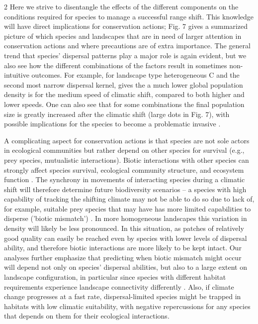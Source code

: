 \documentclass[12pt,pdftex]{article}
\begin{document}
\begin{spacing}{2}
Here we strive to disentangle the effects of the different components on the conditions required for species to manage a successful range shift. This knowledge will have direct implications for conservation actions; Fig. 7 gives a summarized picture of which species and landscapes that are in need of larger attention in conservation actions and where precautions are of extra importance. The general trend that species' dispersal patterns play a major role is again evident, but we also see how the different combinations of the factors result in sometimes non-intuitive outcomes. For example, for landscape type heterogeneous C and the second most narrow dispersal kernel, gives the a much lower global population density is for the medium speed of climatic shift, compared to both higher and lower speeds. One can also see that for some combinations the final population size is greatly increased after the climatic shift (large dots in Fig. 7), with possible implications for the species to become a problematic invasive \citep[for a summary of potential mechanisms, see ][]{Hellmann2008}.  %

A complicating aspect for conservation actions is that species are not sole actors in ecological communities but rather depend on other species for survival (e.g., prey species, mutualistic interactions). Biotic interactions with other species can strongly affect species survival, ecological community structure, and ecosystem function \citep{Pocock2012}. The synchrony in movements of interacting species during a climatic shift will therefore determine future biodiversity scenarios – a species with high capability of tracking the shifting climate may not be able to do so due to lack of, for example, suitable prey species that may have has more limited capabilities to disperse ('biotic mismatch') \citep{Chivers2017}. In more homogeneous landscapes this variation in density will likely be less pronounced. In this situation, as patches of relatively good quality can easily be reached even by species with lower levels of dispersal ability, and therefore biotic interactions are more likely to be kept intact. Our analyses further emphasize that predicting when biotic mismatch might occur will depend not only on species' dispersal abilities, but also to a large extent on landscape configuration, in particular since species with different habitat requirements experience landscape connectivity differently \citep{Taylor1993}. Also, if climate change progresses at a fast rate, dispersal-limited species might be trapped in habitats with low climatic suitability, with negative repercussions for any species that depends on them for their ecological interactions. 


\end{spacing}
\end{document}
